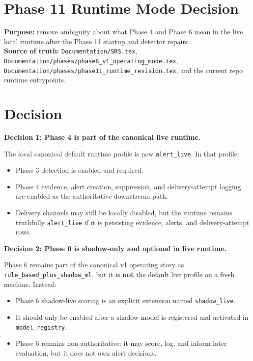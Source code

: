 \documentclass{article}
\begin{document}
\section*{Phase 11 Runtime Mode Decision}

\textbf{Purpose:} remove ambiguity about what Phase 4 and Phase 6 mean in the
live local runtime after the Phase 11 startup and detector repairs.\\
\textbf{Source of truth:} \texttt{Documentation/SRS.tex},
\texttt{Documentation/phases/phase8\_v1\_operating\_mode.tex},
\texttt{Documentation/phases/phase11\_runtime\_revision.tex}, and the current
repo runtime entrypoints.

\section*{Decision}

\textbf{Decision 1: Phase 4 is part of the canonical live runtime.}

The local canonical default runtime profile is now
\texttt{alert\_live}. In that profile:
\begin{itemize}
\item Phase 3 detection is enabled and required.
\item Phase 4 evidence, alert creation, suppression, and delivery-attempt
logging are enabled as the authoritative downstream path.
\item Delivery channels may still be locally disabled, but the runtime remains
truthfully \texttt{alert\_live} if it is persisting evidence, alerts, and
delivery-attempt rows.
\end{itemize}

\textbf{Decision 2: Phase 6 is shadow-only and optional in live runtime.}

Phase 6 remains part of the canonical v1 operating story as
\texttt{rule\_based\_plus\_shadow\_ml}, but it is \textbf{not} the default live
profile on a fresh machine. Instead:
\begin{itemize}
\item Phase 6 shadow-live scoring is an explicit extension named
\texttt{shadow\_live}.
\item It should only be enabled after a shadow model is registered and
activated in \texttt{model\_registry}.
\item Phase 6 remains non-authoritative: it may score, log, and inform later
evaluation, but it does not own alert decisions.
\end{itemize}
\end{document}

